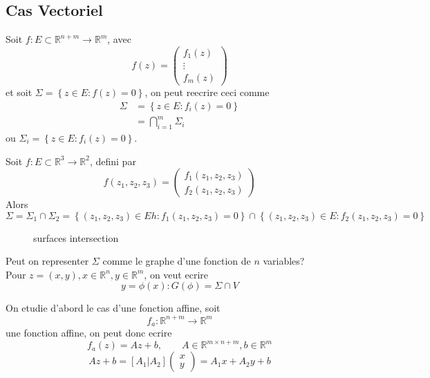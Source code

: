 \documentclass[../main.tex]{subfiles}
\begin{document}
\subsection{Cas Vectoriel}
Soit $f: E \subset \mathbb{R}^{n+m}\to \mathbb{R}^m$, avec 
\[ 
	f( z) = \begin{pmatrix}
		f_1( z) \\ \vdots \\ f_m( z) 
	\end{pmatrix}
\]
et soit $\Sigma = \left\{ z \in E: f( z) = 0 \right\} $, on peut reecrire ceci comme
\begin{align*}
	\Sigma &= \left\{ z \in E: f_i( z) =0 \right\} \\
	&= \bigcap_{i=1}^{m} \Sigma_i
\end{align*}
ou $\Sigma_i= \left\{ z \in E: f_i( z) =0 \right\}  $.\\
\begin{exemple}
Soit $f: E \subset \mathbb{R}^{3} \to \mathbb{R}^{2}$, defini par
\[ 
	f( z_1,z_2,z_3)  = \begin{pmatrix}
		f_1( z_1,z_2,z_3) \\ f_2( z_1,z_2,z_3) 
	\end{pmatrix}
\]
Alors 
\[ 
	\Sigma = \Sigma_1\cap \Sigma_2 = \left\{ ( z_1,z_2,z_3 ) \in Eh: f_1( z_1,z_2,z_3)=0  \right\} \cap \left\{ ( z_1,z_2,z_3 ) \in E: f_2( z_1,z_2,z_3)=0  \right\}
\]
\begin{figure}[H]
    \centering
    \caption{surfaces intersection}
    \label{fig:surfaces-intersection}
\end{figure}
Peut on representer $\Sigma$ comme le graphe d'une fonction de $n$ variables?\\
Pour $z= ( x,y) , x \in \mathbb{R}^n, y \in \mathbb{R}^m$, on veut ecrire 
\[ 
	y= \phi( x) : G( \phi) = \Sigma \cap V
\]

\end{exemple}
On etudie d'abord le cas d'une fonction affine, soit
\[ 
f_a: \mathbb{R}^{n+m} \to \mathbb{R}^m
\]
une fonction affine, on peut donc ecrire
\[ 
	f_a( z) = Az +b, \qquad A \in \mathbb{R}^{m \times n+m}, b \in \mathbb{R}^{m}
\]
\[ 
Az + b = \left[ A_1 | A_2 \right] \begin{pmatrix}
x \\ y
\end{pmatrix}
 =  A_1x + A_2y + b
\]
\end{document}
